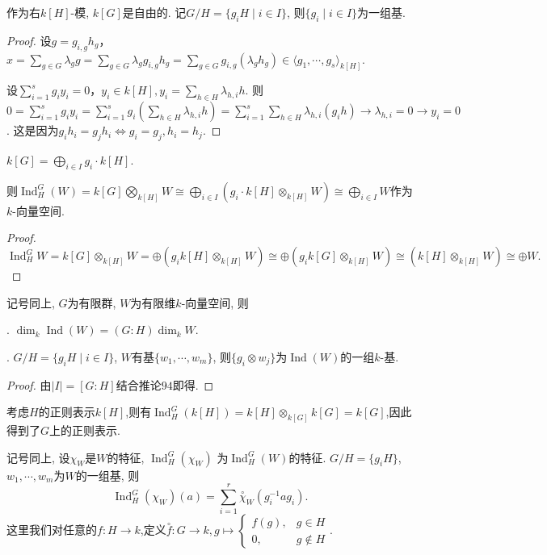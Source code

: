 \begin{proposition}
    作为右$k[H]$-模, $k[G]$是自由的. 
    记$G/H=\{g_iH\mid i\in I\}$, 则$\{g_i\mid i\in I\}$为一组基.
\end{proposition}
\begin{proof}
	设$g=g_{i,g}h_g$，$x=\sum_{g\in G}\lambda_gg
    =\sum_{g\in G}\lambda_gg_{i,g}h_g=\sum_{g\in G} g_{i,g}(\lambda_g h_g)
    \in \langle g_1,\cdots,g_s\rangle_{k[H]}$.
	
	设$\sum_{i=1}^{s} g_iy_i=0$，$y_i\in k[H],y_i=\sum_{h\in H} \lambda_{h,i}h$.
    则$0=\sum_{i=1}^{s} g_iy_i=\sum_{i=1}^{s} g_i(\sum_{h\in H} \lambda_{h,i}h)
    =\sum_{i=1}^{s}\sum_{h\in H} \lambda_{h,i}(g_ih)
    \rightarrow \lambda_{h,i}=0\rightarrow y_i=0$.
    这是因为$g_ih_i=g_jh_i\Longleftrightarrow g_i=g_j,h_i=h_j$.
	
	
\end{proof}
\begin{corollary}
    $k[G]=\bigoplus\limits_{i\in I} g_i\cdot k[H]$.\par
    \qquad 则$\operatorname{Ind}_H^G(W)=k[G]\bigotimes_{k[H]}W
    \cong \bigoplus\limits_{i\in I} (g_i\cdot k[H]\otimes_{k[H]} W)
    \cong \bigoplus\limits_{i\in I} W$作为$k$-向量空间.
\end{corollary}
\begin{proof}

$\operatorname{Ind}_H^{G}W=k[G]\otimes_{k[H]}W
    =\oplus (g_ik[H]\otimes_{k[H]}W)\cong \oplus (g_ik[G]\otimes_{k[H]}W)
    \cong (k[H]\otimes_{k[H]}W)\cong \oplus W.$
\end{proof}
\begin{proposition} 记号同上, $G$为有限群, $W$为有限维$k$-向量空间, 则\par
    . $\dim_k \operatorname{Ind}(W)=(G:H)\dim_k W$.\par
    . $G/H=\{g_iH\mid i\in I\}$, $W$有基$\{w_1,\cdots,w_m\}$, 
    则$\{g_i\otimes w_j\}$为$\operatorname{Ind}(W)$的一组$k$-基.
\end{proposition}
\begin{proof}
由$|I| = [G:H]$结合推论$94$即得.
\end{proof}
\begin{example}
考虑$H$的正则表示$k[H]$,则有$\operatorname{Ind}_H^G(k[H]) = k[H] \otimes_{k[G]} k[G] = k[G]$,因此得到了$G$上的正则表示.
\end{example}
\begin{proposition}
    记号同上, 设$\chi_W$是$W$的特征, $\operatorname{Ind}_H^G(\chi_W)$
    为$\operatorname{Ind}_H^G(W)$的特征. 
    $G/H=\{g_iH\}$, $w_1,\cdots,w_m$为$W$的一组基, 则
    $$\operatorname{Ind}_H^G(\chi_W)(a)
    =\sum\limits_{i=1}^r \stackrel{\circ}{\chi}_W(g_i^{-1}ag_i).$$
    这里我们对任意的$f:H\to k$,定义$\stackrel{\circ}{f}:G\to k, g\mapsto\begin{cases}
        f(g), &  g\in H \\
        0, & g\notin H
    \end{cases}.$

\end{proposition}

